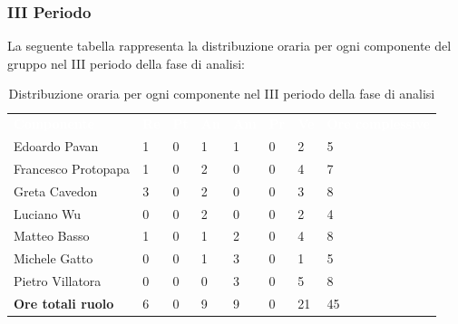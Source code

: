 \subsubsection{III Periodo}
La seguente tabella rappresenta la distribuzione oraria per ogni componente del gruppo nel III periodo della fase di analisi:
\begin{table}[!htbp]
\begin{center}
\renewcommand{\arraystretch}{1.25}
\begin{tabular}{ m{}<{\centering}  m{}<{\centering} m{}<{\centering} m{}<{\centering}  m{}<{\centering}  m{}<{\centering}  m{}<{\centering}  m{}<{\centering}   }
	\rowcolor{darkblue}
	\textcolor{white}{\textbf{Componente}} &\textcolor{white}{\textbf{Re}}&\textcolor{white}{\textbf{Pt}}&\textcolor{white}{\textbf{An}}&\textcolor{white}{\textbf{Am}}&\textcolor{white}{\textbf{Pr}}&\textcolor{white}{\textbf{Ve}}&\textcolor{white}{\textbf{Ore complessive}}\\ 
	Edoardo Pavan & 1 & 0 & 1 & 1 & 0 & 2 & 5 \\	
	
	Francesco Protopapa & 1 & 0 & 2 & 0 & 0 & 4 & 7 \\

	Greta Cavedon & 3 & 0 & 2 & 0 & 0 & 3 & 8 \\
	
	Luciano Wu & 0 & 0 & 2 & 0 & 0 & 2 & 4 \\
	
	Matteo Basso & 1 & 0 & 1 & 2 & 0 & 4 & 8 \\
	
	Michele Gatto &  0 & 0 & 1 & 3 & 0 & 1 & 5 \\
	
	Pietro Villatora & 0 & 0 & 0 & 3 & 0 & 5 & 8 \\
	
	\textbf{Ore totali ruolo} & 6 & 0 & 9 & 9 & 0 & 21 & 45\\

\end{tabular}
\caption{Distribuzione oraria per ogni componente nel III periodo della fase di analisi}
\end{center}
\end{table}

